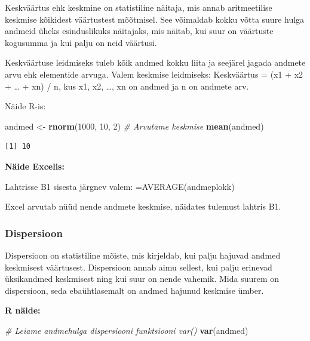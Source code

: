 \documentclass[
]{book}
\newenvironment{Shaded}{\begin{snugshade}}{\end{snugshade}}
\newcommand{\CommentTok}[1]{\textcolor[rgb]{0.56,0.35,0.01}{\textit{#1}}}
\newcommand{\DecValTok}[1]{\textcolor[rgb]{0.00,0.00,0.81}{#1}}
\newcommand{\FunctionTok}[1]{\textcolor[rgb]{0.13,0.29,0.53}{\textbf{#1}}}
\newcommand{\NormalTok}[1]{#1}
\newcommand{\OtherTok}[1]{\textcolor[rgb]{0.56,0.35,0.01}{#1}}
\renewenvironment{Shaded} {\begin{snugshade}\footnotesize} {\end{snugshade}}
\begin{document}
Keskväärtus ehk keskmine on statistiline näitaja, mis annab aritmeetilise keskmise kõikidest väärtustest mõõtmisel. See võimaldab kokku võtta suure hulga andmeid üheks esinduslikuks näitajaks, mis näitab, kui suur on väärtuste kogusumma ja kui palju on neid väärtusi.

Keskväärtuse leidmiseks tuleb kõik andmed kokku liita ja seejärel jagada andmete arvu ehk elementide arvuga. Valem keskmise leidmiseks: Keskväärtus = (x1 + x2 + \ldots{} + xn) / n, kus x1, x2, \ldots, xn on andmed ja n on andmete arv.

Näide R-is:

\begin{Shaded}
\begin{Highlighting}[]
\NormalTok{andmed }\OtherTok{\textless{}{-}} \FunctionTok{rnorm}\NormalTok{(}\DecValTok{1000}\NormalTok{, }\DecValTok{10}\NormalTok{, }\DecValTok{2}\NormalTok{)}
\CommentTok{\# Arvutame keskmise}
\FunctionTok{mean}\NormalTok{(andmed)}
\end{Highlighting}
\end{Shaded}

\begin{verbatim}
[1] 10
\end{verbatim}

\textbf{Näide Excelis:}

\begin{Shaded}
\begin{Highlighting}[]
\NormalTok{Lahtrisse B1 sisesta järgnev valem: \textasciigrave{}=AVERAGE(andmeplokk)\textasciigrave{}}
\end{Highlighting}
\end{Shaded}

Excel arvutab nüüd nende andmete keskmise, näidates tulemust lahtris B1.

\subsubsection{Dispersioon}\label{dispersioon}

Dispersioon on statistiline mõiste, mis kirjeldab, kui palju hajuvad andmed keskmisest väärtusest. Dispersioon annab aimu sellest, kui palju erinevad üksikandmed keskmisest ning kui suur on nende vahemik. Mida suurem on dispersioon, seda ebaühtlasemalt on andmed hajunud keskmise ümber.

\textbf{R näide:}

\begin{Shaded}
\begin{Highlighting}[]
\CommentTok{\# Leiame andmehulga dispersiooni funktsiooni var()}
\FunctionTok{var}\NormalTok{(andmed)}
\end{Highlighting}
\end{Shaded}
\end{document}
